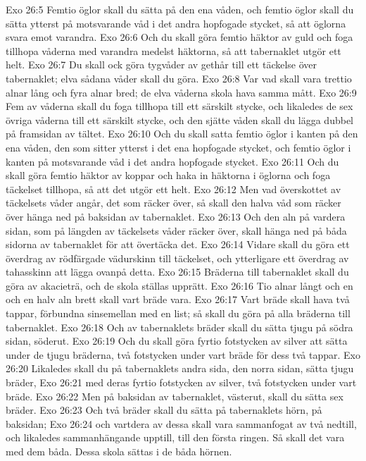 Exo 26:5  Femtio öglor skall du sätta på den ena våden, och femtio öglor skall du sätta ytterst på motsvarande våd i det andra hopfogade stycket, så att öglorna svara emot varandra.
Exo 26:6  Och du skall göra femtio häktor av guld och foga tillhopa våderna med varandra medelst häktorna, så att tabernaklet utgör ett helt.
Exo 26:7  Du skall ock göra tygvåder av gethår till ett täckelse över tabernaklet; elva sådana våder skall du göra.
Exo 26:8  Var vad skall vara trettio alnar lång och fyra alnar bred; de elva våderna skola hava samma mått.
Exo 26:9  Fem av våderna skall du foga tillhopa till ett särskilt stycke, och likaledes de sex övriga våderna till ett särskilt stycke, och den sjätte våden skall du lägga dubbel på framsidan av tältet.
Exo 26:10  Och du skall satta femtio öglor i kanten på den ena våden, den som sitter ytterst i det ena hopfogade stycket, och femtio öglor i kanten på motsvarande våd i det andra hopfogade stycket.
Exo 26:11  Och du skall göra femtio häktor av koppar och haka in häktorna i öglorna och foga täckelset tillhopa, så att det utgör ett helt.
Exo 26:12  Men vad överskottet av täckelsets våder angår, det som räcker över, så skall den halva våd som räcker över hänga ned på baksidan av tabernaklet.
Exo 26:13  Och den aln på vardera sidan, som på längden av täckelsets våder räcker över, skall hänga ned på båda sidorna av tabernaklet för att övertäcka det.
Exo 26:14  Vidare skall du göra ett överdrag av rödfärgade vädurskinn till täckelset, och ytterligare ett överdrag av tahasskinn att lägga ovanpå detta.
Exo 26:15  Bräderna till tabernaklet skall du göra av akacieträ, och de skola ställas upprätt.
Exo 26:16  Tio alnar långt och en och en halv aln brett skall vart bräde vara.
Exo 26:17  Vart bräde skall hava två tappar, förbundna sinsemellan med en list; så skall du göra på alla bräderna till tabernaklet.
Exo 26:18  Och av tabernaklets bräder skall du sätta tjugu på södra sidan, söderut.
Exo 26:19  Och du skall göra fyrtio fotstycken av silver att sätta under de tjugu bräderna, två fotstycken under vart bräde för dess två tappar.
Exo 26:20  Likaledes skall du på tabernaklets andra sida, den norra sidan, sätta tjugu bräder,
Exo 26:21  med deras fyrtio fotstycken av silver, två fotstycken under vart bräde.
Exo 26:22  Men på baksidan av tabernaklet, västerut, skall du sätta sex bräder.
Exo 26:23  Och två bräder skall du sätta på tabernaklets hörn, på baksidan;
Exo 26:24  och vartdera av dessa skall vara sammanfogat av två nedtill, och likaledes sammanhängande upptill, till den första ringen. Så skall det vara med dem båda. Dessa skola sättas i de båda hörnen.
